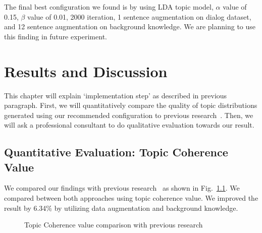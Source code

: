 \documentclass[senior]{IPSstyle}
\begin{document}
The final best configuration we found is by using LDA topic model, $\alpha$ value of 0.15, $\beta$ value of 0.01, 2000 iteration, 1 sentence augmentation on dialog dataset, and 12 sentence augmentation on background knowledge. We are planning to use this finding in future experiment.

\chapter{Results and Discussion} 

This chapter will explain ‘implementation step’ as described in previous paragraph. First, we will quantitatively compare the quality of topic distributions generated using our recommended configuration to previous research~\cite{goto2}. Then, we will ask a professional consultant to do qualitative evaluation towards our result.

\section{Quantitative Evaluation: Topic Coherence Value}

We compared our findings with previous research~\cite{goto2} as shown in Fig.~\ref{fig_tme3}. We compared between both approaches using topic coherence value. We improved the result by 6.34\% by utilizing data augmentation and background knowledge.

\begin{figure}[h]
	\centering
	\caption{Topic Coherence value comparison with previous research}
\label{fig_tme3}
\end{figure}
\end{document}
